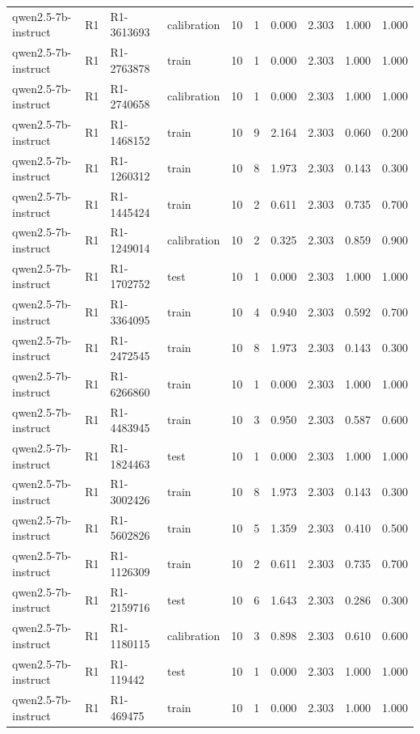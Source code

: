 \begin{table}
\begin{tabular}{llllrrrrrr}
qwen2.5-7b-instruct & R1 & R1-3613693 & calibration & 10 & 1 & 0.000 & 2.303 & 1.000 & 1.000 \\
qwen2.5-7b-instruct & R1 & R1-2763878 & train & 10 & 1 & 0.000 & 2.303 & 1.000 & 1.000 \\
qwen2.5-7b-instruct & R1 & R1-2740658 & calibration & 10 & 1 & 0.000 & 2.303 & 1.000 & 1.000 \\
qwen2.5-7b-instruct & R1 & R1-1468152 & train & 10 & 9 & 2.164 & 2.303 & 0.060 & 0.200 \\
qwen2.5-7b-instruct & R1 & R1-1260312 & train & 10 & 8 & 1.973 & 2.303 & 0.143 & 0.300 \\
qwen2.5-7b-instruct & R1 & R1-1445424 & train & 10 & 2 & 0.611 & 2.303 & 0.735 & 0.700 \\
qwen2.5-7b-instruct & R1 & R1-1249014 & calibration & 10 & 2 & 0.325 & 2.303 & 0.859 & 0.900 \\
qwen2.5-7b-instruct & R1 & R1-1702752 & test & 10 & 1 & 0.000 & 2.303 & 1.000 & 1.000 \\
qwen2.5-7b-instruct & R1 & R1-3364095 & train & 10 & 4 & 0.940 & 2.303 & 0.592 & 0.700 \\
qwen2.5-7b-instruct & R1 & R1-2472545 & train & 10 & 8 & 1.973 & 2.303 & 0.143 & 0.300 \\
qwen2.5-7b-instruct & R1 & R1-6266860 & train & 10 & 1 & 0.000 & 2.303 & 1.000 & 1.000 \\
qwen2.5-7b-instruct & R1 & R1-4483945 & train & 10 & 3 & 0.950 & 2.303 & 0.587 & 0.600 \\
qwen2.5-7b-instruct & R1 & R1-1824463 & test & 10 & 1 & 0.000 & 2.303 & 1.000 & 1.000 \\
qwen2.5-7b-instruct & R1 & R1-3002426 & train & 10 & 8 & 1.973 & 2.303 & 0.143 & 0.300 \\
qwen2.5-7b-instruct & R1 & R1-5602826 & train & 10 & 5 & 1.359 & 2.303 & 0.410 & 0.500 \\
qwen2.5-7b-instruct & R1 & R1-1126309 & train & 10 & 2 & 0.611 & 2.303 & 0.735 & 0.700 \\
qwen2.5-7b-instruct & R1 & R1-2159716 & test & 10 & 6 & 1.643 & 2.303 & 0.286 & 0.300 \\
qwen2.5-7b-instruct & R1 & R1-1180115 & calibration & 10 & 3 & 0.898 & 2.303 & 0.610 & 0.600 \\
qwen2.5-7b-instruct & R1 & R1-119442 & test & 10 & 1 & 0.000 & 2.303 & 1.000 & 1.000 \\
qwen2.5-7b-instruct & R1 & R1-469475 & train & 10 & 1 & 0.000 & 2.303 & 1.000 & 1.000 \\

\end{tabular}
\end{table}

